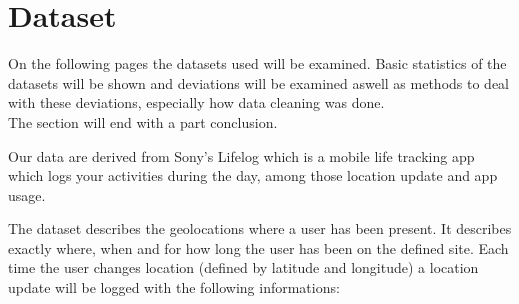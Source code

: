 \chapter{Dataset}
\label{chap:dataset}
On the following pages the datasets used will be examined. Basic statistics of the datasets will be shown and deviations will be examined aswell as methods to deal with these deviations, especially how data cleaning was done. \\
The section will end with a part conclusion. 

Our data are derived from Sony's Lifelog\cite{sonyLifeLog} which is a mobile life tracking app which logs your activities during the day, among those location update and app usage. 

The dataset describes the geolocations where a user has been present. It describes exactly where, when and for how long the user has been on the defined site. Each time the user changes location (defined by latitude and longitude) a location update will be logged with the following informations: 

